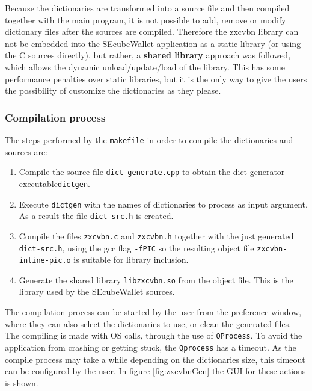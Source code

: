 Because the dictionaries are transformed into a source file and then compiled together with the main program, it is not possible to add, remove or modify dictionary files after the sources are compiled. Therefore the zxcvbn library can not be embedded into the SEcubeWallet application as a static library (or using the C sources directly), but rather, a \textbf{shared library} approach was followed, which allows the dynamic unload/update/load of the library. This has some performance penalties over static libraries, but it is the only way to give the users the possibility of customize the dictionaries as they please.

\subsubsection*{Compilation process}

The steps performed by the \texttt{makefile} in order to compile the dictionaries and sources are:

\begin{enumerate}
\setlength\itemsep{-3pt}

\item Compile the source file \texttt{dict-generate.cpp} to obtain the dict generator executable\texttt{dictgen}.
\item Execute \texttt{dictgen} with the names of dictionaries to process as input argument. As a result the file \texttt{dict-src.h} is created.
\item Compile the files \texttt{zxcvbn.c} and \texttt{zxcvbn.h} together with the just generated \texttt{dict-src.h}, using the gcc flag \texttt{-fPIC} so the resulting object file \texttt{zxcvbn-inline-pic.o} is suitable for library inclusion.
\item Generate the shared library \texttt{libzxcvbn.so} from the object file. This is the library used by the SEcubeWallet sources.
\end{enumerate}

The compilation process can be started by the user from the preference window, where they can also select the dictionaries to use, or clean the generated files. The compiling is made with OS calls, through the use of \texttt{QProcess}. To avoid the application from crashing or getting stuck, the \texttt{Qprocess} has a timeout. As the compile process may take a while depending on the dictionaries size, this timeout can be configured by the user. In figure \ref{fig:zxcvbnGen} the GUI for these actions is shown.

